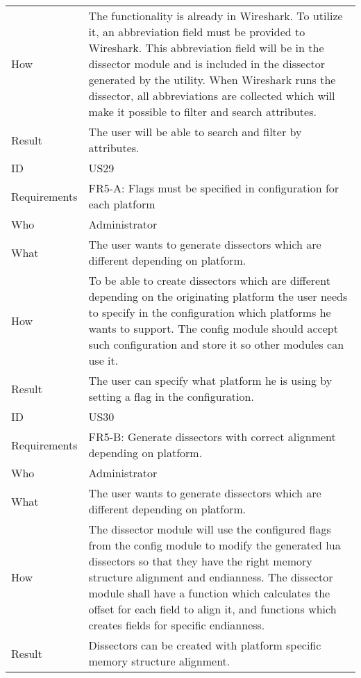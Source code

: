 \begin{table}[htbp]
{\begin{tabularx}{1.2\textwidth}{l X}
	How & The functionality is already in Wireshark. To utilize it, an abbreviation field must be provided to Wireshark. This abbreviation field will 			be in the dissector module and is included in the dissector generated by the utility. When Wireshark runs the dissector, all abbreviations are 			collected which will make it possible to filter and search attributes. \\
	Result & The user will be able to search and filter by attributes. \\
	\midrule
	ID & US29 \\
	Requirements & FR5-A: Flags must be specified in configuration for each platform \\
	Who & Administrator \\
	What & The user wants to generate dissectors which are different depending on platform. \\
	How & To be able to create dissectors which are different depending on the originating platform the user needs to specify in the 				configuration which platforms he wants to support. The config module should accept such configuration and store it so other modules
	can use it. \\ 
	Result & The user can specify what platform he is using by setting a flag in the configuration. \\
	\midrule
	ID & US30 \\
	Requirements & FR5-B: Generate dissectors with correct alignment depending on platform.\\
	Who & Administrator \\
	What & The user wants to generate dissectors which are different depending on platform. \\
	How & The dissector module will use the configured flags from the config module to modify the generated lua dissectors so that they have 			the right memory structure alignment and endianness. The dissector module shall have a function which calculates the offset for each field 			to align it, and functions which creates fields for specific endianness. \\
	Result & Dissectors can be created with platform specific memory structure alignment. \\
	\bottomrule
\end{tabularx}}
\end{table}

